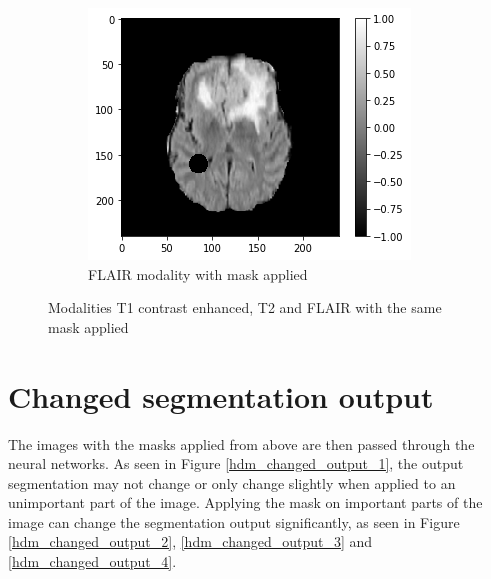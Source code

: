 \begin{figure}[H]
    \begin{subfigure}[t]{.33\textwidth}
        \centering
        \includegraphics[width=\linewidth]{chapters/06_hdm/images_masked/masked_3.png}
        \caption{FLAIR modality with mask applied}
    \end{subfigure}
    \caption{Modalities T1 contrast enhanced, T2 and FLAIR with the same mask applied}
    \label{hdm_masks_2}
\end{figure}



\section{Changed segmentation output}
The images with the masks applied from above are then passed through the neural networks. As seen in Figure \ref{hdm_changed_output_1}, the output segmentation may not change or only change slightly when applied to an unimportant part of the image. Applying the mask on important parts of the image can change the segmentation output significantly, as seen in Figure \ref{hdm_changed_output_2}, \ref{hdm_changed_output_3} and \ref{hdm_changed_output_4}.

